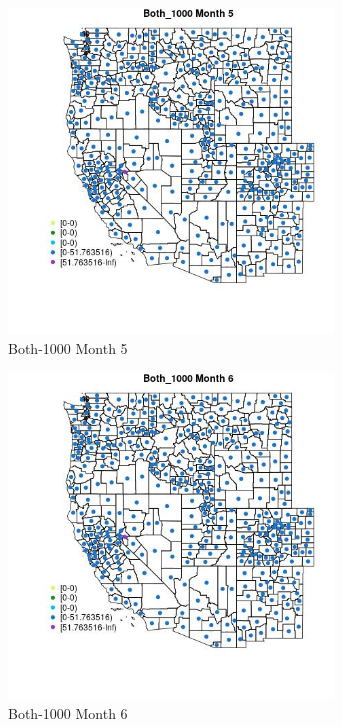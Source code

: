 \begin{figure} 
\centering  
\includegraphics[width=0.77\textwidth]{Code_Outputs/df_report_ML_predictors_CountyCentroid_Locations_Dates_2008-01-01to2018-12-31_MapObsMo5Both_1000.jpg} 
\caption{\label{fig:df_report_ML_predictors_CountyCentroid_Locations_Dates_2008-01-01to2018-12-31MapObsMo5Both_1000}Both-1000 Month 5} 
\end{figure} 
 

\begin{figure} 
\centering  
\includegraphics[width=0.77\textwidth]{Code_Outputs/df_report_ML_predictors_CountyCentroid_Locations_Dates_2008-01-01to2018-12-31_MapObsMo6Both_1000.jpg} 
\caption{\label{fig:df_report_ML_predictors_CountyCentroid_Locations_Dates_2008-01-01to2018-12-31MapObsMo6Both_1000}Both-1000 Month 6} 
\end{figure} 
 

